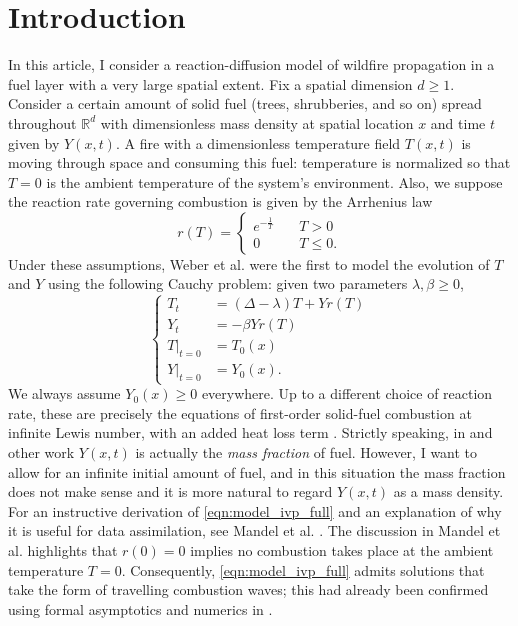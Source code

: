\documentclass[twosided, 12pt]{article}
\numberwithin{equation}{section}
\theoremstyle{plain}
\begin{document}
\section{Introduction}
\par In this article, I consider a reaction-diffusion model of wildfire propagation in a fuel layer with a very large spatial extent. Fix a spatial dimension $d\geq 1$. Consider a certain amount of solid fuel (trees, shrubberies, and so on) spread throughout $\mathbb{R}^d$ with dimensionless mass density at spatial location $x$ and time $t$ given by $Y(x,t)$. A fire with a dimensionless temperature field $T(x,t)$ is moving through space and consuming this fuel: temperature is normalized so that $T=0$ is the ambient temperature of the system's environment. Also, we suppose the reaction rate governing combustion is given by the Arrhenius law 
\begin{equation}\label{eqn:reaction_rate}
r(T) = \begin{cases}
e^{-\frac{1}{T}} & \quad T>0
\\
0 & \quad T\leq 0.
\end{cases}
\end{equation}
Under these assumptions, Weber et al. \cite{WMSG1997} were the first to model the evolution of $T$ and $Y$ using the following Cauchy problem: given two parameters $\lambda, \beta\geq0$, 
\begin{equation}\label{eqn:model_ivp_full}
\left\{
\begin{aligned}
    T_{t} &=  \left(\Delta - \lambda\right) T + Y r\left(T\right)
    \\
    Y_{t} &= -\beta Y r\left(T\right)
    \\
    T|_{t=0} &= T_0(x)
    \\
    Y|_{t=0} &= Y_0(x). 
\end{aligned}
\right.
\end{equation}
We always assume $Y_0(x)\geq 0$ everywhere. Up to a different choice of reaction rate, these are precisely the equations of first-order solid-fuel combustion at infinite Lewis number, with an added heat loss term \cite[\S 1.3]{BE1989}. Strictly speaking, in \cite{WMSG1997} and other work $Y(x,t)$ is actually the \emph{mass fraction} of fuel. However, I want to allow for an infinite initial amount of fuel, and in this situation the mass fraction does not make sense and it is more natural to regard $Y(x,t)$ as a mass density. For an instructive derivation of \eqref{eqn:model_ivp_full} and an explanation of why it is useful for data assimilation, see Mandel et al. \cite{Mandel_etal_2008}. The discussion in Mandel et al. highlights that $r(0)=0$ implies no combustion takes place at the ambient temperature $T=0$. Consequently, \eqref{eqn:model_ivp_full} admits solutions that take the form of travelling combustion waves; this had already been confirmed using formal asymptotics and numerics in \cite{WMSG1997}. 
\end{document}
